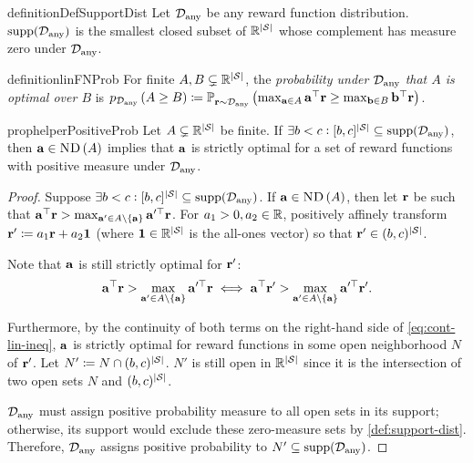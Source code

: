 \begin{restatable}{definition}{DefSupportDist}\label{def:support-dist}
Let $\mathcal{D}_{\text{any}}$ be any reward function distribution. $\supp[\Dany]$ is the smallest closed subset of $\mathbb{R}^{\left|\mathcal{S}\right|}$ whose complement has measure zero under $\mathcal{D}_{\text{any}}$. 
\end{restatable} 

\begin{restatable}{definition}{linFNProb}
For finite $A,B\subsetneq \mathbb{R}^{\left|\mathcal{S}\right|}$, the \emph{probability under $\mathcal{D}_{\text{any}}$ that $A$ is optimal over $B$} is $\phelper{A\geq B}[\Dany]\defeq \optprob[\rf \sim \Dany]{\max_{\av\in A} \av^\top \rf \geq \max_{\bv\in B} \bv^\top \rf}$. 
\end{restatable}

\begin{restatable}{prop}{helperPositiveProb}\label{prop:helper-positive-prob} 
Let $A\subsetneq \mathbb{R}^{\left|\mathcal{S}\right|}$ be finite. If $\exists b<c:[b,c]^{\abs{\St}} \subseteq \supp[\Dany]$, then $\mathbf{a}\in\text{\upshape\textsc{ND}}\left(A\right)$ implies that $\mathbf{a}$ is strictly optimal for a set of reward functions with positive measure under $\mathcal{D}_{\text{any}}$. 
\end{restatable}
\begin{proof}
Suppose $\exists b<c:[b,c]^{\abs{\St}} \subseteq \supp[\Dany]$. If $\mathbf{a}\in\text{\upshape\textsc{ND}}\left(A\right)$, then let $\mathbf{r}$ be such that $\mathbf{a}^\top \mathbf{r} > \max_{\mathbf{a}'\in A\setminus\left\{\mathbf{a}\right\}} \mathbf{a}'^\top \mathbf{r}$. For $a_1>0, a_2\in \mathbb{R}$, positively affinely transform $\mathbf{r}'\coloneqq a_1\mathbf{r} + a_2\mathbf{1}$ (where $\mathbf{1}\in\mathbb{R}^{\left|\mathcal{S}\right|}$ is the all-ones vector) so that $\mathbf{r}' \in (b,c)^{\left|\mathcal{S}\right|}$. 

Note that $\mathbf{a}$ is still strictly optimal for $\mathbf{r}'$:
\begin{equation}
    \mathbf{a}^\top \mathbf{r} > \max_{\mathbf{a}'\in A\setminus\left\{\mathbf{a}\right\}} \mathbf{a}'^\top \mathbf{r} \iff \mathbf{a}^\top \mathbf{r}' > \max_{\mathbf{a}'\in A\setminus\left\{\mathbf{a}\right\}} \mathbf{a}'^\top \mathbf{r}'.\label{eq:cont-lin-ineq}
\end{equation}

Furthermore, by the continuity of both terms on the right-hand side of \cref{eq:cont-lin-ineq}, $\mathbf{a}$ is strictly optimal for reward functions in some open neighborhood $N$ of $\mathbf{r}'$. Let $N'\coloneqq N\cap (b,c)^{\left|\mathcal{S}\right|}$. $N'$ is still open in $\mathbb{R}^{\left|\mathcal{S}\right|}$ since it is the intersection of two open sets $N$ and $(b,c)^{\left|\mathcal{S}\right|}$. 

$\mathcal{D}_{\text{any}}$ must assign positive probability measure to all open sets in its support; otherwise, its support would exclude these zero-measure sets by \cref{def:support-dist}. Therefore, $\mathcal{D}_{\text{any}}$ assigns positive probability to $N'\subseteq \supp[\Dany]$. 
\end{proof}   

